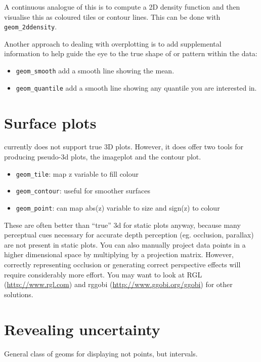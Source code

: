 A continuous analogue of this is to compute a 2D density function and then visualise this as coloured tiles or contour lines.  This can be done with {\tt geom\_2ddensity}.

Another approach to dealing with overplotting is to add supplemental information to help guide the eye to the true shape of or pattern within the data:

\begin{itemize}
	\item {\tt geom\_smooth} add a smooth line showing the mean.
	\item {\tt geom\_quantile} add a smooth line showing any quantile you are interested in.
\end{itemize}

\section{Surface plots}

\ggplot currently does not support true 3D plots.  However, it does offer two tools for producing pseudo-3d plots, the imageplot and the contour plot.

\begin{itemize}
	\item {\tt geom\_tile}: map z variable to fill colour
	\item {\tt geom\_contour}: useful for smoother surfaces
	\item {\tt geom\_point}: can map abs(z) variable to size and sign(z) to colour
\end{itemize}

These are often better than ``true'' 3d for static plots anyway, because many perceptual cues necessary for accurate depth perception (eg. occlusion, parallax) are not present in static plots.  You can also manually project data points in a higher dimensional space by multiplying by a projection matrix.  However, correctly representing occlusion or generating correct perspective effects will require considerably more effort.  You may want to look at RGL (\url{http://www.rgl.com}) and rggobi (\url{http://www.ggobi.org/ggobi}) for other solutions.

\section{Revealing uncertainty}\label{sub:displaying_uncertainty}

General class of geoms for displaying not points, but intervals.  

